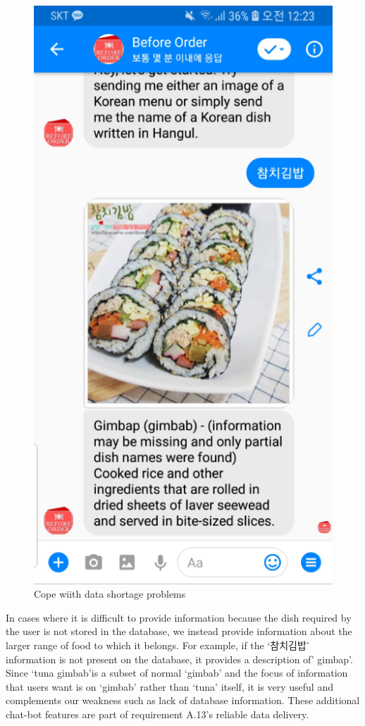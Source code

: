 \begin{figure}[htbp]
\centerline{\includegraphics[height=\custompicheight]{./pictures/facebook_additional_feature}}
\caption{Cope wiith data shortage problems}
\label{fig:Before Order_features}
\end{figure}
\FloatBarrier

In cases where it is difficult to provide information because the dish required by the user is not stored in the database, we instead provide information about the larger range of food to which it belongs. For example, if the ‘참치김밥' information is not present on the database, it provides a description of’ gimbap’. Since ‘tuna gimbab’is a subset of normal ‘gimbab’ and the focus of information that users want is on ‘gimbab’ rather than ‘tuna’ itself, it is very useful and complements our weakness such as lack of database information. These additional chat-bot features are part of requirement A.13's reliable data delivery.

